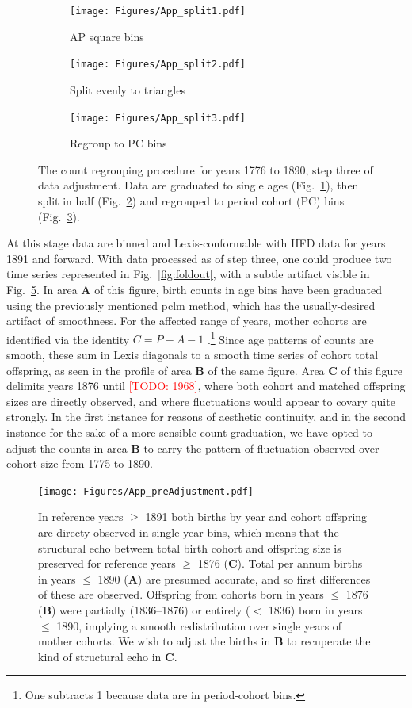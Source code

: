 \documentclass{article}
\renewcommand{\todo}[1]{\textcolor{red}{[TODO: #1]}}
\begin{document}
\begin{appendix}
\begin{figure}[ht!]
\centering
\begin{subfigure}{.3\textwidth}
  \centering
  \texttt{[image: Figures/App\_split1.pdf]}
  \caption{AP square bins}
  \label{fig:app1}
\end{subfigure}%
\begin{subfigure}{.3\textwidth}
  \centering
  \texttt{[image: Figures/App\_split2.pdf]}
  \caption{Split evenly to triangles}
  \label{fig:app2}
\end{subfigure}
\begin{subfigure}{.3\textwidth}
  \centering
  \texttt{[image: Figures/App\_split3.pdf]}
  \caption{Regroup to PC bins}
  \label{fig:app3}
\end{subfigure}
\caption{The count regrouping procedure for years 1776 to 1890, step three of data adjustment. Data are graduated to single ages (Fig.~\ref{fig:app1}), then split in half (Fig.~\ref{fig:app2}) and regrouped to period cohort (PC) bins (Fig.~\ref{fig:app3}).}
\label{fig:AP2PC}
\end{figure}
At this stage data are binned and Lexis-conformable with HFD data for years 1891 and forward. With data processed as of step three, one could produce two time series represented in Fig.~\ref{fig:foldout}, with a subtle artifact visible in Fig.~\ref{fig:toosmooth}. In area \textbf{A} of this figure, birth counts in age bins have been graduated using the previously mentioned pclm method, which has the usually-desired artifact of smoothness. For the affected range of years, mother cohorts are identified via the identity $C = P - A - 1$ .\footnote{One subtracts 1 because data are in period-cohort bins.} Since age patterns of counts are smooth, these sum in Lexis diagonals to a smooth time series of cohort total offspring, as seen in the profile of area \textbf{B} of the same figure. Area \textbf{C} of this figure delimits years 1876 until \todo{1968}, where both cohort and matched offspring sizes are directly observed, and where fluctuations would appear to covary quite strongly. In the first instance for reasons of aesthetic continuity, and in the second instance for the sake of a more sensible count graduation, we have opted to adjust the counts in area \textbf{B} to carry the pattern of fluctuation observed over cohort size from 1775 to 1890.

\begin{figure}[ht!]
\centering
 \texttt{[image: Figures/App\_preAdjustment.pdf]}
\caption{In reference years $\ge$ 1891 both births by year and cohort offspring are directy observed in single year bins, which means that the structural echo between total birth cohort and offspring size is preserved for reference years $\ge$ 1876  (\textbf{C}). Total per annum births in years $\le$ 1890 (\textbf{A}) are presumed accurate, and so first differences of these are observed. Offspring from cohorts born in years $\le$ 1876 (\textbf{B}) were partially (1836--1876) or entirely ($<$ 1836) born in years $\le$ 1890, implying a smooth redistribution over single years of mother cohorts. We wish to adjust the births in \textbf{B} to recuperate the kind of structural echo in \textbf{C}.}
\label{fig:toosmooth}
\end{figure}


\end{appendix}
\end{document}
